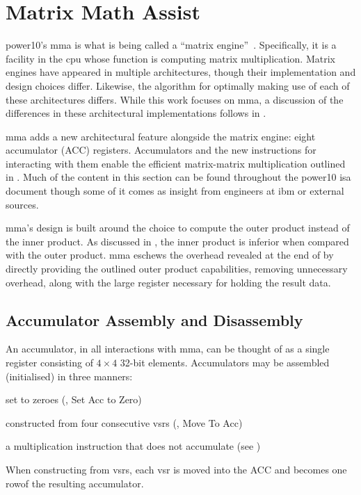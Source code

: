 \documentclass[\main/thesis.tex]{subfiles}
\begin{document}
\chapter{Matrix Math Assist}
\label{cha:mma}

\Gls{power10}'s \gls{mma} is what is being called a ``matrix engine''~\autocite{domke2021matrix}.
Specifically, it is a facility in the \gls{cpu} whose function is computing matrix multiplication.
Matrix engines have appeared in multiple architectures, though their implementation and design choices differ.
Likewise, the algorithm for optimally making use of each of these architectures differs.
While this work focuses on \gls{mma}, a discussion of the differences in these architectural implementations follows in .

\gls{mma} adds a new architectural feature alongside the matrix engine: eight accumulator (ACC) registers.
Accumulators and the new instructions for interacting with them enable the efficient matrix-matrix multiplication outlined in .
Much of the content in this section can be found throughout the \gls{power10} \gls{isa} document though some of it comes as insight from engineers at \gls{ibm} or external sources.

\Gls{mma}'s design is built around the choice to compute the outer product instead of the inner product.
As discussed in , the inner product is inferior when compared with the outer product.
\Gls{mma} eschews the overhead revealed at the end of  by directly providing the outlined outer product capabilities, removing unnecessary overhead, along with the large register necessary for holding the result data.

\section{Accumulator Assembly and Disassembly}
\label{sec:assDis}
An accumulator, in all interactions with \gls{mma}, can be thought of as a single register consisting of $4 \times 4$ 32-bit elements.
Accumulators may be assembled (initialised) in three manners:
\begin{enumerate*}[itemjoin*={{ and }}, label=\textbf{(\arabic*)}, after={.}]
  \item set to zeroes (, Set Acc to Zero)
  \item constructed from four consecutive \glspl{vsr} (, Move To Acc)
  \item a multiplication instruction that does not accumulate (see )
\end{enumerate*}
When constructing from \glspl{vsr}, each \gls{vsr} is moved into the ACC and becomes one row\footnotemark of the resulting accumulator.
\end{document}
